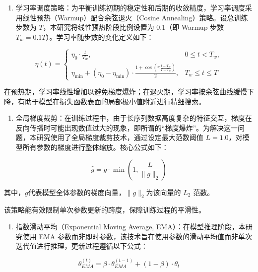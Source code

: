 \begin{enumerate}
\def\labelenumi{(\arabic{enumi})}
\setcounter{enumi}{1}
\item
  学习率调度策略：为平衡训练初期的稳定性和后期的收敛精度，学习率调度采用线性预热（Warmup）配合余弦退火（Cosine Annealing）策略。设总训练步数为 $ T $，本研究将线性预热阶段比例设置为 0.1（即 Warmup 步数 $ T_w=0.1T $）。学习率随步数的变化定义如下：
\end{enumerate}
\begin{equation}
\eta(t)=
\begin{cases}
\eta_0\cdot \frac{t}{T_w}, & 0\le t<T_w, \\
\eta_{\min}+(\eta_0-\eta_{\min})\cdot \frac{1+\cos\left(\pi\frac{t-T_w}{T-T_w}\right)}{2}, & T_w\le t\le T
\end{cases}
\end{equation}

在预热期，学习率线性增加以避免梯度爆炸；在退火期，学习率按余弦曲线缓慢下降，有助于模型在损失函数表面的局部极小值附近进行精细搜索。

\begin{enumerate}
\def\labelenumi{(\arabic{enumi})}
\setcounter{enumi}{2}
\item
  全局梯度裁剪：在训练过程中，由于长序列数据高度复杂的特征交互，梯度在反向传播时可能出现数值过大的现象，即所谓的``梯度爆炸''。为解决这一问题，本研究使用了全局梯度裁剪技术，通过设定最大范数阈值 $ L=1.0 $，对模型所有参数的梯度进行整体缩放。核心公式如下：
\end{enumerate}
\begin{equation}
\hat{g} = g \cdot \min \left( 1, \frac{L}{\|g\|_2} \right)
\end{equation}

其中，$ g $代表模型全体参数的梯度向量，$ \|g\|_2 $为该向量的 $ L_2 $ 范数。

该策略能有效限制单次参数更新的跨度，保障训练过程的平滑性。

\begin{enumerate}
\def\labelenumi{(\arabic{enumi})}
\setcounter{enumi}{3}
\item
  指数滑动平均（Exponential Moving Average, EMA）：在模型推理阶段，本研究使用 EMA 参数而非即时参数，该技术旨在使用参数的滑动平均值而非单次迭代值进行推理，更新过程遵循以下公式：
\end{enumerate}
\begin{equation}
\theta_{EMA}^{(t)} = \beta \cdot \theta_{EMA}^{(t-1)} + (1 - \beta) \cdot \theta_t
\end{equation}

